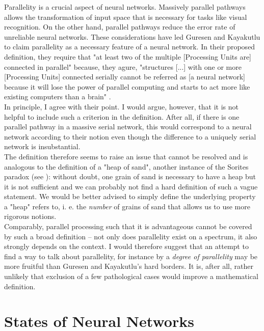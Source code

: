 \documentclass[a4paper,11pt]{report}
\begin{document}
\begin{Par}[Parallelity]
Parallelity is a crucial aspect of neural networks. Massively parallel pathways allows the transformation of input space that is necessary for tasks like visual recognition. On the other hand, parallel pathways reduce the error rate of unreliable neural networks. These considerations have led Guresen and Kayakutlu \cite{Guresen2011} to claim parallelity as a necessary feature of a neural network. In their proposed definition, they require that "at least two of the multiple [Processing Units are] connected in parallel" \cite[][428]{Guresen2011} because, they agure, "structures [...] with one or more [Processing Units] connected serially cannot be referred as [a neural network] because it will lose the power of parallel computing and starts to act more like existing computers than a brain" \cite[][428]{Guresen2011}.\\
In principle, I agree with their point. I would argue, however, that it is not helpful to include such a criterion in the definition. After all, if there is one parallel pathway in a massive serial network, this would correspond to a neural network according to their notion even though the difference to a uniquely serial network is insubstantial.\\
The definition therefore seems to raise an issue that cannot be resolved and is analogous to the definition of a "heap of sand", another instance of the Sorites paradox (see \cite{Hyde2014}): without doubt, one grain of sand is necessary to have a heap but it is not sufficient and we can probably not find a hard definition of such a vague statement. We would be better advised to simply define the underlying property a "heap" refers to, i. e. the \emph{number} of grains of sand that allows us to use more rigorous notions.\\
Comparably, parallel processing such that it is advantageous cannot be covered by such a broad definition -- not only does parallelity exist on a spectrum, it also strongly depends on the context. I would therefore suggest that an attempt to find a way to talk about parallelity, for instance by a \emph{degree of parallelity} may be more fruitful than Guresen and Kayakutlu's hard borders. It is, after all, rather unlikely that exclusion of a few pathological cases would improve a mathematical definition.
\end{Par}

\section{States of Neural Networks}\label{sec:theory-states}
\end{document}

